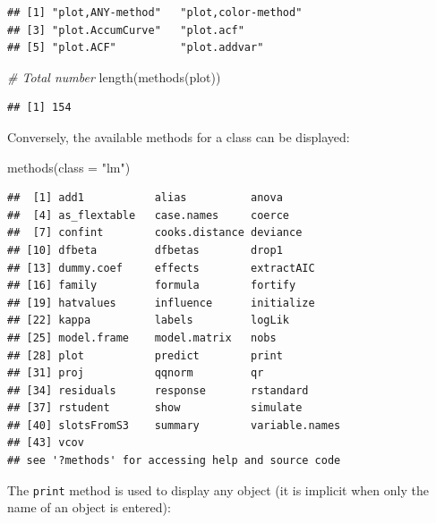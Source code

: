 \documentclass[
  12pt,
  american,
  a4paper,
  extrafontsizes,onecolumn,openright
  ]{memoir}
\newenvironment{Shaded}{\begin{snugshade}}{\end{snugshade}}
\newcommand{\AttributeTok}[1]{\textcolor[rgb]{0.77,0.63,0.00}{#1}}
\newcommand{\CommentTok}[1]{\textcolor[rgb]{0.56,0.35,0.01}{\textit{#1}}}
\newcommand{\FunctionTok}[1]{\textcolor[rgb]{0.00,0.00,0.00}{#1}}
\newcommand{\NormalTok}[1]{#1}
\newcommand{\StringTok}[1]{\textcolor[rgb]{0.31,0.60,0.02}{#1}}
\begin{document}
\begin{verbatim}
## [1] "plot,ANY-method"   "plot,color-method"
## [3] "plot.AccumCurve"   "plot.acf"         
## [5] "plot.ACF"          "plot.addvar"
\end{verbatim}

\begin{Shaded}
\begin{Highlighting}[]
\CommentTok{\# Total number}
\FunctionTok{length}\NormalTok{(}\FunctionTok{methods}\NormalTok{(plot))}
\end{Highlighting}
\end{Shaded}

\begin{verbatim}
## [1] 154
\end{verbatim}

\normalsize

Conversely, the available methods for a class can be displayed:

\scriptsize

\begin{Shaded}
\begin{Highlighting}[]
\FunctionTok{methods}\NormalTok{(}\AttributeTok{class =} \StringTok{"lm"}\NormalTok{)}
\end{Highlighting}
\end{Shaded}

\begin{verbatim}
##  [1] add1           alias          anova         
##  [4] as_flextable   case.names     coerce        
##  [7] confint        cooks.distance deviance      
## [10] dfbeta         dfbetas        drop1         
## [13] dummy.coef     effects        extractAIC    
## [16] family         formula        fortify       
## [19] hatvalues      influence      initialize    
## [22] kappa          labels         logLik        
## [25] model.frame    model.matrix   nobs          
## [28] plot           predict        print         
## [31] proj           qqnorm         qr            
## [34] residuals      response       rstandard     
## [37] rstudent       show           simulate      
## [40] slotsFromS3    summary        variable.names
## [43] vcov          
## see '?methods' for accessing help and source code
\end{verbatim}

\normalsize

The \texttt{print} method is used to display any object (it is implicit when only the name of an object is entered):

\scriptsize
\end{document}
